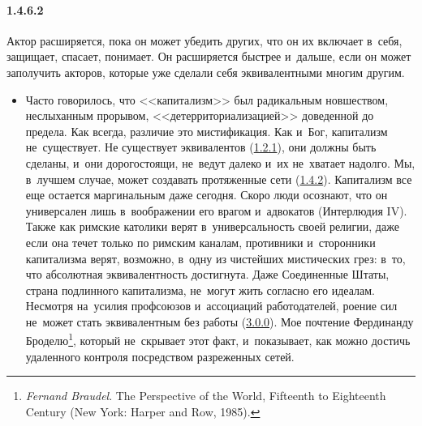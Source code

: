 \paragraph{1.4.6.2}\hypertarget{par:1.4.6.2}{} Актор расширяется, пока он может убедить других, что он их включает в~себя, защищает, спасает, понимает. Он расширяется быстрее и~дальше, если он может заполучить акторов, которые уже сделали себя эквивалентными многим другим.
	\begin{itemize}
	\item Часто говорилось, что <<капитализм>> был радикальным новшеством, неслыханным прорывом, <<детерриториализацией>> доведенной до предела. Как всегда, различие это мистификация. Как и~Бог, капитализм не~существует. Не существует эквивалентов (\hyperlink{par:1.2.1}{1.2.1}), они должны быть сделаны, и~они дорогостоящи, не~ведут далеко и~их не~хватает надолго. Мы, в~лучшем случае, может создавать протяженные сети (\hyperlink{par:1.4.2}{1.4.2}). Капитализм все еще остается маргинальным даже сегодня. Скоро люди осознают, что он универсален лишь в~воображении его врагом и~адвокатов (Интерлюдия IV). Также как римские католики верят в~универсальность своей религии, даже если она течет только по римским каналам, противники и~сторонники капитализма верят, возможно, в~одну из чистейших мистических грез: в~то, что абсолютная эквивалентность достигнута. Даже Соединенные Штаты, страна подлинного капитализма, не~могут жить согласно его идеалам. Несмотря на~усилия профсоюзов и~ассоциаций работодателей, роение сил не~может стать эквивалентным без работы (\hyperlink{par:3.0.0}{3.0.0}). Мое почтение Фердинанду Броделю\footnote{{\itshape Fernand Braudel}. The Perspective of the World, Fifteenth to Eighteenth Century (New York: Harper and Row, 1985).}, который не~скрывает этот факт, и~показывает, как можно достичь удаленного контроля посредством разреженных сетей.
	\end{itemize}

